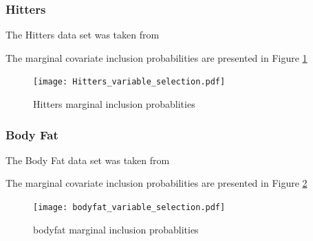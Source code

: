 \documentclass{amsart}[12pt]
\begin{document}


\subsubsection{Hitters}

The Hitters data set was taken from \cite{James:2014:ISL:2517747}

The marginal covariate inclusion probabilities are presented in Figure \ref{fig:Hitters_inclusion}

\begin{figure}[p]
	\label{fig:Hitters_inclusion}
	\caption{Hitters marginal inclusion probablities}
	\texttt{[image: Hitters\_variable\_selection.pdf]}
\end{figure}

\subsubsection{Body Fat}
The Body Fat data set was taken from \cite{James:2014:ISL:2517747}

The marginal covariate inclusion probabilities are presented in Figure \ref{fig:bodyfat_inclusion}


\begin{figure}[p]
	\label{fig:bodyfat_inclusion}
	\caption{bodyfat marginal inclusion probablities}
	\texttt{[image: bodyfat\_variable\_selection.pdf]}
\end{figure}
\end{document}
